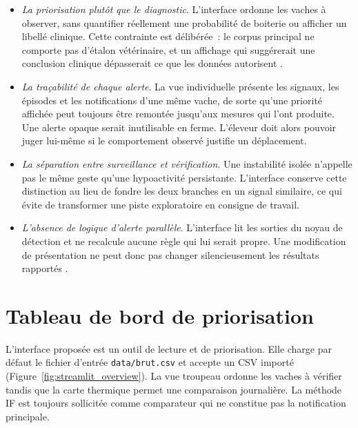 \begin{itemize}
  \item \emph{La priorisation plutôt que le diagnostic}. L'interface ordonne les
  vaches à observer, sans quantifier réellement une probabilité de boiterie ou afficher un
  libellé clinique. Cette contrainte est délibérée~: le corpus principal ne comporte pas
  d'étalon vétérinaire, et un affichage qui suggérerait une conclusion clinique dépasserait ce
  que les données autorisent \citep{alsaaod2019automatic}.

  \item \emph{La traçabilité de chaque alerte}. La vue individuelle présente les
  signaux, les épisodes et les notifications d'une même vache, de sorte qu'une priorité
  affichée peut toujours être remontée jusqu'aux mesures qui l'ont produite. Une alerte
  opaque serait inutilisable en ferme. L'éleveur doit alors pouvoir juger lui-même si le
  comportement observé justifie un déplacement.

  \item \emph{La séparation entre surveillance et vérification}. Une instabilité
  isolée n'appelle pas le même geste qu'une hypoactivité persistante. L'interface conserve
  cette distinction au lieu de fondre les deux branches en un signal similaire, ce qui évite de
  transformer une piste exploratoire en consigne de travail.

  \item \emph{L'absence de logique d'alerte parallèle}. L'interface lit les sorties
  du noyau de détection et ne recalcule aucune règle qui lui serait propre. Une modification de
  présentation ne peut donc pas changer silencieusement les résultats rapportés
  \citep{sculley2015hidden}.
\end{itemize}

\section{Tableau de bord de priorisation}
\label{sec:interface_streamlit}
L'interface proposée est un outil de lecture et de priorisation. Elle charge par défaut le
fichier d'entrée \texttt{data/brut.csv} et accepte un CSV importé
(Figure~\ref{fig:streamlit_overview}). La vue troupeau ordonne
les vaches à vérifier tandis que la carte thermique permet une comparaison journalière. La
méthode IF est toujours sollicitée comme comparateur qui ne constitue pas la notification
principale.

